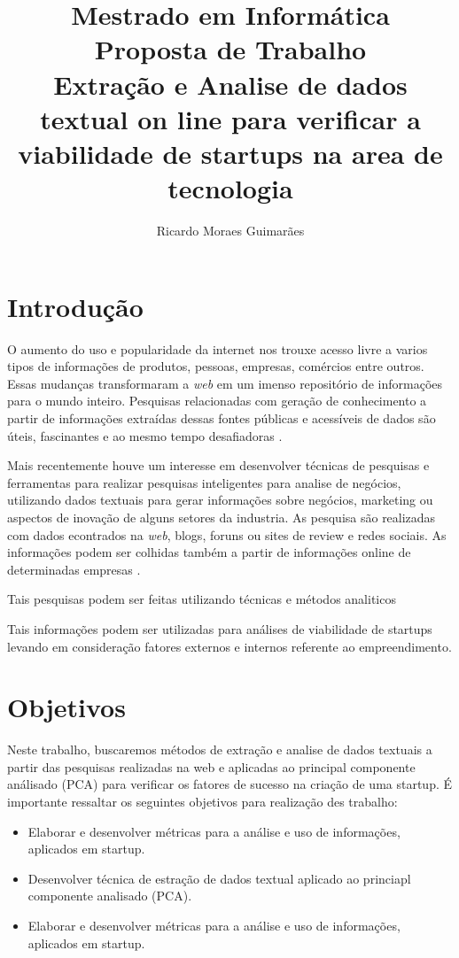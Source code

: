 \documentclass[12pt]{article}
\title{Mestrado em Informática\\ Proposta de Trabalho \\ Extração e Analise de dados textual on line para verificar a viabilidade de startups na area de tecnologia}
\author{Ricardo Moraes Guimarães\inst{1}}
\begin{document}
\maketitle

\section{Introdução} \label{sec:intro}
O aumento do uso e popularidade da internet nos trouxe acesso livre a varios tipos de informações de produtos, pessoas, empresas, comércios entre outros. Essas mudanças transformaram a \textit{web} em um imenso repositório de informações para o mundo inteiro. Pesquisas relacionadas com geração de conhecimento a partir de informações extraídas dessas fontes públicas e acessíveis de dados são úteis, fascinantes e ao mesmo tempo desafiadoras \cite{liu:11}.

Mais recentemente houve um interesse em desenvolver técnicas de pesquisas e ferramentas para realizar pesquisas inteligentes para analise de negócios, utilizando dados textuais para gerar informações sobre negócios, marketing ou aspectos de inovação de alguns setores da industria. As pesquisa são realizadas com dados econtrados na \textit{web}, blogs, foruns ou sites de review e redes sociais. As informações podem ser colhidas também a partir de informações online de determinadas empresas \cite{Tollo:15}. 

Tais pesquisas podem ser feitas utilizando técnicas e métodos analiticos 



Tais informações podem ser utilizadas para análises de viabilidade de startups levando em consideração fatores externos e internos referente ao empreendimento.



\section{Objetivos} \label{sec:objec}

Neste trabalho, buscaremos métodos de extração e analise de dados textuais a partir das pesquisas realizadas na web e aplicadas ao principal componente análisado (PCA) para verificar os fatores de sucesso na criação de uma startup. É importante ressaltar os seguintes objetivos para realização des trabalho:

\begin{itemize}
	\item{Elaborar e desenvolver métricas para a análise e uso de informações, aplicados em startup.}
	\item{Desenvolver técnica de estração de dados textual aplicado ao princiapl componente analisado (PCA).}
	\item{Elaborar e desenvolver métricas para a análise e uso de informações, aplicados em startup.}
\end{itemize}
\end{document}
